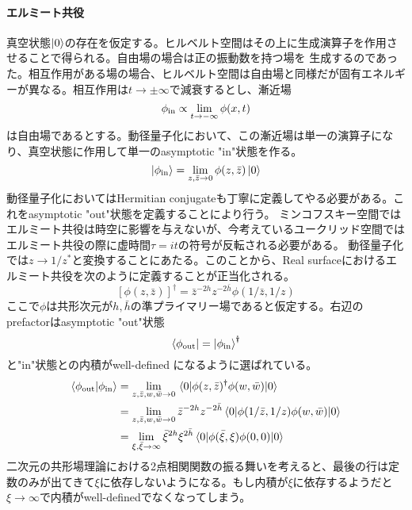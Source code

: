 \documentclass[11pt, aps, longbibliography]{article}
\numberwithin{equation}{section}
\begin{document}
    \paragraph{エルミート共役}
        真空状態$\ket{0}$の存在を仮定する。ヒルベルト空間はその上に生成演算子を作用させることで得られる。自由場の場合は正の振動数を持つ場を
        生成するのであった。相互作用がある場の場合、ヒルベルト空間は自由場と同様だが固有エネルギーが異なる。相互作用は$t\rightarrow \pm \infty$で減衰するとし、漸近場
        \begin{equation}\label{eq:radialquant1}
            \phi_{\rm in} \propto \lim_{t\rightarrow -\infty} \phi(x, t)
        \end{equation}
        は自由場であるとする。動径量子化において、この漸近場は単一の演算子になり、真空状態に作用して単一のasymptotic "in"状態を作る。
        \begin{equation}\label{eq:radialquant2}
                \ket{\phi_{\rm in}} = \lim_{z,\bar{z}\rightarrow 0}\phi(z, \bar{z})\ket{0}
        \end{equation}
        動径量子化においてはHermitian conjugateも丁寧に定義してやる必要がある。これをasymptotic "out"状態を定義することにより行う。
        ミンコフスキー空間ではエルミート共役は時空に影響を与えないが、今考えているユークリッド空間ではエルミート共役の際に虚時間$\tau = it$の符号が反転される必要がある。
        動径量子化では$z\rightarrow 1/z^*$と変換することにあたる。このことから、Real surfaceにおけるエルミート共役を次のように定義することが正当化される。
        \begin{equation}\label{eq:radialquant3}
            [\phi(z,\bar{z})]^\dagger = \bar{z}^{-2h}z^{-2\bar{h}}\phi(1/\bar{z}, 1/z)
        \end{equation}
        ここで$\phi$は共形次元が$h,\bar{h}$の準プライマリー場であると仮定する。右辺のprefactorはasymptotic "out"状態
        \begin{equation}\label{eq:radialquant4}
            \bra{\phi_{\rm out}} = \ket{\phi_{\rm in}}^\dagger
        \end{equation}
        と"in"状態との内積がwell-defined になるように選ばれている。
        \begin{align}\label{eq:radialquant5}
            \braket{\phi_{\rm out}}{\phi_{\rm in}} &= \lim_{z,\bar{z},w,\bar{w}\rightarrow 0} \expval{\phi(z,\bar{z})^\dagger \phi(w,\bar{w})}{0} \notag \\
            &=  \lim_{z,\bar{z},w,\bar{w}\rightarrow 0} \bar{z}^{-2h}z^{-2\bar{h}}\expval{\phi(1/\bar{z}, 1/z) \phi(w,\bar{w})}{0} \notag \\
            &= \lim_{\xi, \bar{\xi}\rightarrow \infty} \bar{\xi}^{2h} \xi^{2\bar{h}}\expval{\phi(\bar{\xi},\xi)\phi(0,0)}{0}
        \end{align}
        二次元の共形場理論における2点相関関数の振る舞いを考えると、最後の行は定数のみが出てきて$\xi$に依存しないようになる。もし内積が$\xi$に依存するようだと$\xi\rightarrow \infty$で内積がwell-definedでなくなってしまう。
\end{document}
